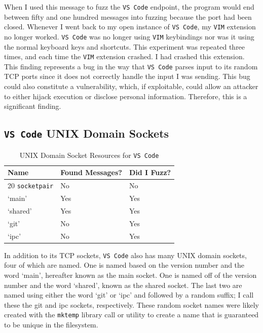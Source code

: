 When I used this message to fuzz the \texttt{VS Code} endpoint, the program would end between fifty and one hundred messages into fuzzing because the port had been closed.  Whenever I went back to my open instance of \texttt{VS Code}, my \texttt{VIM} extension no longer worked.  \texttt{VS Code} was no longer using \texttt{VIM} keybindings nor was it using the normal keyboard keys and shortcuts.  This experiment was repeated three times, and each time the \texttt{VIM} extension crashed.  I had crashed this extension.  This finding represents a bug in the way that \texttt{VS Code} parses input to its random TCP ports since it does not correctly handle the input I was sending.  This bug could also constitute a vulnerability, which, if exploitable, could allow an attacker to either hijack execution or disclose personal information.  Therefore, this is a significant finding.

\subsection{\texttt{VS Code} UNIX Domain Sockets}
\label{sec:codeUnix}

\begin{table}
\centering
\begin{normalsize}
\begin{tabular}{ l | l | l }
\textbf{Name} & \textbf{Found Messages?} & \textbf{Did I Fuzz?} \\ \hline
20 \texttt{socketpair} & No & No \\ \hline
`main' & Yes & Yes \\ \hline
`shared' & Yes & Yes \\ \hline
`git' & No & Yes \\ \hline
`ipc' & No & Yes \\ \hline
\end{tabular}
\caption{UNIX Domain Socket Resources for \texttt{VS Code}}
\label{tab:vsCodeTcp}
\end{normalsize}
\end{table} 

In addition to its TCP sockets, \texttt{VS Code} also has many UNIX domain sockets,  four of which are named.  One is named based on the version number and the word `main', hereafter known as the main socket.  One is named off of the version number and the word `shared', known as the shared socket.  The last two are named using either the word `git' or `ipc' and followed by a random suffix; I call these the git and ipc sockets, respectively.  These random socket names were likely created with the \texttt{mktemp} library call or utility to create a name that is guaranteed to be unique in the filesystem.

